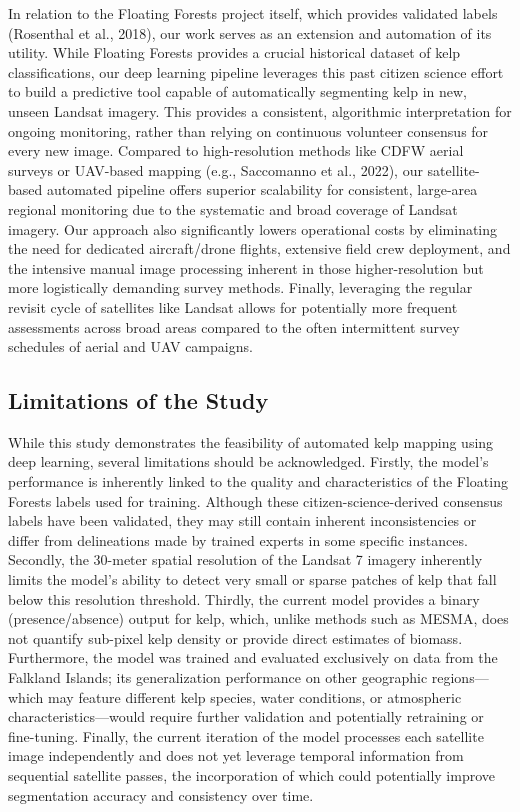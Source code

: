 \documentclass{article}
\begin{document}
In relation to the Floating Forests project itself, which provides validated labels (Rosenthal et al., 2018), our work serves as an extension and automation of its utility. While Floating Forests provides a crucial historical dataset of kelp classifications, our deep learning pipeline leverages this past citizen science effort to build a predictive tool capable of automatically segmenting kelp in new, unseen Landsat imagery. This provides a consistent, algorithmic interpretation for ongoing monitoring, rather than relying on continuous volunteer consensus for every new image. Compared to high-resolution methods like CDFW aerial surveys or UAV-based mapping (e.g., Saccomanno et al., 2022), our satellite-based automated pipeline offers superior scalability for consistent, large-area regional monitoring due to the systematic and broad coverage of Landsat imagery. Our approach also significantly lowers operational costs by eliminating the need for dedicated aircraft/drone flights, extensive field crew deployment, and the intensive manual image processing inherent in those higher-resolution but more logistically demanding survey methods. Finally, leveraging the regular revisit cycle of satellites like Landsat allows for potentially more frequent assessments across broad areas compared to the often intermittent survey schedules of aerial and UAV campaigns.

\subsection{Limitations of the Study}

While this study demonstrates the feasibility of automated kelp mapping using deep learning, several limitations should be acknowledged. Firstly, the model's performance is inherently linked to the quality and characteristics of the Floating Forests labels used for training. Although these citizen-science-derived consensus labels have been validated, they may still contain inherent inconsistencies or differ from delineations made by trained experts in some specific instances. Secondly, the 30-meter spatial resolution of the Landsat 7 imagery inherently limits the model's ability to detect very small or sparse patches of kelp that fall below this resolution threshold. Thirdly, the current model provides a binary (presence/absence) output for kelp, which, unlike methods such as MESMA, does not quantify sub-pixel kelp density or provide direct estimates of biomass. Furthermore, the model was trained and evaluated exclusively on data from the Falkland Islands; its generalization performance on other geographic regions—which may feature different kelp species, water conditions, or atmospheric characteristics—would require further validation and potentially retraining or fine-tuning. Finally, the current iteration of the model processes each satellite image independently and does not yet leverage temporal information from sequential satellite passes, the incorporation of which could potentially improve segmentation accuracy and consistency over time.
\end{document}
